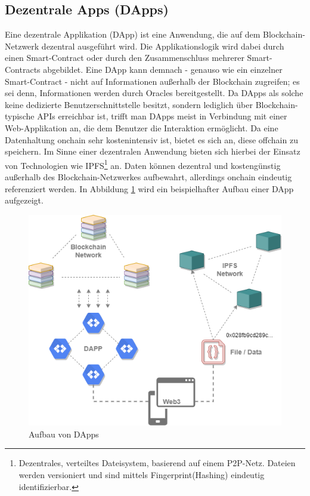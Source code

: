 \subsection{Dezentrale Apps (DApps)}
\label{subsec:fundamentals:dlt:dapps}
Eine dezentrale Applikation (DApp) ist eine Anwendung, die auf dem Blockchain-Netzwerk dezentral ausgeführt wird. Die Applikationslogik wird dabei durch einen Smart-Contract oder durch den Zusammenschluss mehrerer Smart-Contracts abgebildet. Eine \ac{DApp} kann demnach - genauso wie ein einzelner Smart-Contract - nicht auf Informationen außerhalb der Blockchain zugreifen; es sei denn, Informationen werden durch Oracles bereitgestellt. Da \ac{DApps} als solche keine dedizierte Benutzerschnittstelle besitzt, sondern lediglich über Blockchain-typische \ac{API}s erreichbar ist, trifft man \ac{DApps} meist in Verbindung mit einer Web-Applikation an, die dem Benutzer die Interaktion ermöglicht. Da eine Datenhaltung onchain sehr kostenintensiv ist, bietet es sich an, diese offchain zu speichern. Im Sinne einer dezentralen Anwendung bieten sich hierbei der Einsatz von Technologien wie \ac{IPFS}\footnote{Dezentrales, verteiltes Dateisystem, basierend auf einem \ac{P2P}-Netz. Dateien werden versioniert und sind mittels Fingerprint(Hashing) eindeutig identifizierbar.} an. Daten können dezentral und kostengünstig außerhalb des Blockchain-Netzwerkes aufbewahrt, allerdings onchain eindeutig referenziert werden. In Abbildung \ref{fig:chapter02:overview-dapp} wird ein beispielhafter Aufbau einer \ac{DApp} aufgezeigt.

\begin{figure}[h]
 \centering
 \includegraphics[width=1.0\textwidth]{gfx/Overview-DAPP.png}
 \caption{Aufbau von DApps}
 \label{fig:chapter02:overview-dapp}
\end{figure}

